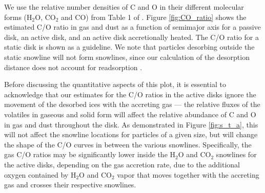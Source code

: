 \documentclass[apj]{emulateapj}
\begin{document}




We use the relative number densities of C and O in their different molecular forms (H$_2$O, CO$_2$ and CO) from Table 1 of \citet{oberg11}. Figure \ref{fig:CO_ratio} shows the estimated C/O ratio in gas and dust as a function of semimajor axis for a passive disk, an active disk, and an active disk accretionally heated. The C/O ratio for a static disk is shown as a guideline. We note that particles desorbing outside the static snowline will not form snowlines, since our calculation of the desorption distance does not account for readsorption  \citep{hollenbach09}. 

Before discussing the quantitative aspects of this plot, it is essential to acknowledge that our estimates for the C/O ratios in the active disks ignore the movement of the desorbed ices with the accreting gas --- the relative fluxes of the volatiles in gaseous and solid form will affect the relative abundance of C and O in gas and dust throughout the disk. As demonstrated in Figure \ref{fig:s_t_a}, this will not affect the snowline locations for particles of a given size, but will change the shape of the C/O curves in between the various snowlines. Specifically, the gas C/O ratios may be significantly lower inside the H$_2$O and CO$_2$ snowlines for the active disks, depending on the gas accretion rate, due to the additional oxygen contained by H$_2$O and CO$_2$ vapor that moves together with the accreting gas and crosses their respective snowlines.
\end{document}
